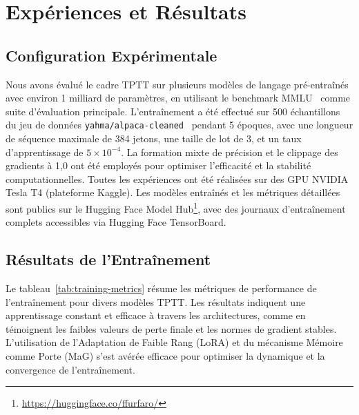 \documentclass[10pt,a4paper]{article}
\begin{document}
\section{Expériences et Résultats}

\subsection{Configuration Expérimentale}

Nous avons évalué le cadre TPTT sur plusieurs modèles de langage pré-entraînés avec environ 1 milliard de paramètres, en utilisant le benchmark MMLU~\cite{hendrycks2020measuring} comme suite d'évaluation principale. L'entraînement a été effectué sur 500 échantillons du jeu de données \texttt{yahma/alpaca-cleaned}~\cite{taori2023alpaca} pendant 5 époques, avec une longueur de séquence maximale de 384 jetons, une taille de lot de 3, et un taux d'apprentissage de $5 \times 10^{-4}$. La formation mixte de précision et le clippage des gradients à 1,0 ont été employés pour optimiser l'efficacité et la stabilité computationnelles. Toutes les expériences ont été réalisées sur des GPU NVIDIA Tesla T4 (plateforme Kaggle). Les modèles entraînés et les métriques détaillées sont publics sur le Hugging Face Model Hub\footnote{\url{https://huggingface.co/ffurfaro/}}, avec des journaux d'entraînement complets accessibles via Hugging Face TensorBoard.

\subsection{Résultats de l'Entraînement}

Le tableau~\ref{tab:training-metrics} résume les métriques de performance de l'entraînement pour divers modèles TPTT. Les résultats indiquent une apprentissage constant et efficace à travers les architectures, comme en témoignent les faibles valeurs de perte finale et les normes de gradient stables. L'utilisation de l'Adaptation de Faible Rang (LoRA) et du mécanisme Mémoire comme Porte (MaG) s'est avérée efficace pour optimiser la dynamique et la convergence de l'entraînement.
\end{document}
